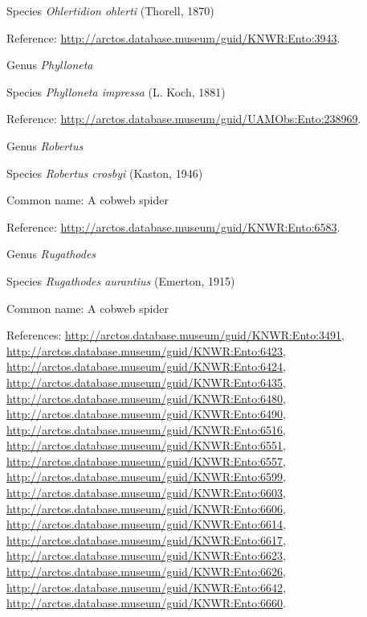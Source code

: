 \documentclass[9pt, article]{memoir}
\begin{document}
\begin{multicols}{2}
\vspace{6pt}\noindent\hspace{36pt}Species \textit{Ohlertidion ohlerti} (Thorell, 1870)


Reference: 
\url{http://arctos.database.museum/guid/KNWR:Ento:3943}.

\vspace{6pt}\noindent\hspace{30pt}Genus \textit{Phylloneta}


\vspace{6pt}\noindent\hspace{36pt}Species \textit{Phylloneta impressa} (L. Koch, 1881)


Reference: 
\url{http://arctos.database.museum/guid/UAMObs:Ento:238969}.

\vspace{6pt}\noindent\hspace{30pt}Genus \textit{Robertus}


\vspace{6pt}\noindent\hspace{36pt}Species \textit{Robertus crosbyi} (Kaston, 1946)


Common name: A cobweb spider

Reference: 
\url{http://arctos.database.museum/guid/KNWR:Ento:6583}.

\vspace{6pt}\noindent\hspace{30pt}Genus \textit{Rugathodes}


\vspace{6pt}\noindent\hspace{36pt}Species \textit{Rugathodes aurantius} (Emerton, 1915)


Common name: A cobweb spider

References: 
\url{http://arctos.database.museum/guid/KNWR:Ento:3491}, 
\url{http://arctos.database.museum/guid/KNWR:Ento:6423}, 
\url{http://arctos.database.museum/guid/KNWR:Ento:6424}, 
\url{http://arctos.database.museum/guid/KNWR:Ento:6435}, 
\url{http://arctos.database.museum/guid/KNWR:Ento:6480}, 
\url{http://arctos.database.museum/guid/KNWR:Ento:6490}, 
\url{http://arctos.database.museum/guid/KNWR:Ento:6516}, 
\url{http://arctos.database.museum/guid/KNWR:Ento:6551}, 
\url{http://arctos.database.museum/guid/KNWR:Ento:6557}, 
\url{http://arctos.database.museum/guid/KNWR:Ento:6599}, 
\url{http://arctos.database.museum/guid/KNWR:Ento:6603}, 
\url{http://arctos.database.museum/guid/KNWR:Ento:6606}, 
\url{http://arctos.database.museum/guid/KNWR:Ento:6614}, 
\url{http://arctos.database.museum/guid/KNWR:Ento:6617}, 
\url{http://arctos.database.museum/guid/KNWR:Ento:6623}, 
\url{http://arctos.database.museum/guid/KNWR:Ento:6626}, 
\url{http://arctos.database.museum/guid/KNWR:Ento:6642}, 
\url{http://arctos.database.museum/guid/KNWR:Ento:6660}.


\end{multicols}
\end{document}
